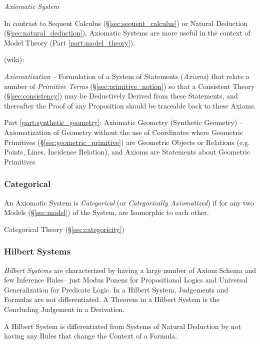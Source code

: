\emph{Axiomatic System}

In contrast to Sequent Calculus (\S\ref{sec:sequent_calculus}) or Natural
Deduction (\S\ref{sec:natural_deduction}), Axiomatic Systems are more useful in
the context of Model Theory (Part \ref{part:model_theory}).

(wiki):

\emph{Axiomatization} -- Formulation of a System of Statements (\emph{Axioms})
that relate a number of \emph{Primitive Terms} (\S\ref{sec:primitive_notion}) so
that a Consistent Theory (\S\ref{sec:consistency}) may be Deductively Derived
from these Statements, and thereafter the Proof of any Proposition should be
traceable back to these Axioms.

\fist Part \ref{part:synthetic_geometry}: Axiomatic Geometry (Synthetic
Geometry) -- Axiomatization of Geometry without the use of Coordinates where
Geometric Primitives (\S\ref{sec:geometric_primitive}) are Geometric Objects or
Relations (e.g. Points, Lines, Incidence Relation), and Axioms are Statements
about Geometric Primitives



\subsubsection{Categorical}\label{sec:categorical}

An Axiomatic System is \emph{Categorical} (or \emph{Categorically
  Axiomatized}) if for any two Models (\S\ref{sec:model}) of the
System, are Isomorphic to each other.

Categorical Theory (\S\ref{sec:categoricity})



\subsubsection{Hilbert Systems}\label{sec:hilbert_system}

\emph{Hilbert Systems} are characterized by having a large number of
Axiom Schema and few Inference Rules-- just Modus Ponens for
Propositional Logics and Universal Generalization for Predicate
Logic. In a Hilbert System, Judgements and Formulas are not
differentiated. A Theorem in a Hilbert System is the Concluding
Judgement in a Derivation.

A Hilbert System is differentiated from Systems of Natural Deduction
by not having any Rules that change the Context of a Formula.



